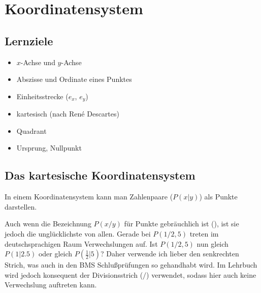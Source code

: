 
\section{Koordinatensystem}
\subsection*{Lernziele}

\begin{itemize}
\item $x$-Achse und $y$-Achse
\item Abszisse und Ordinate eines Punktes
\item Einheitsstrecke ($e_x$, $e_y$)
\item kartesisch (nach René Descartes)
\item Quadrant 
\item Ursprung, Nullpunkt
\end{itemize}


\subsection{Das kartesische Koordinatensystem}
In einem Koordinatensystem kann man Zahlenpaare ($P(x|y)$) als Punkte
darstellen.

\begin{bemerkung}{}{}
  Auch wenn die Bezeichnung $P(x/y)$ für Punkte gebräuchlich ist (\cite{frommenwiler17alg}), ist
  sie jedoch die unglücklichste von allen. Gerade bei $P(1/2,5)$
  treten im deutschsprachigen Raum Verwechslungen auf. Ist $P(1/2,5)$
  nun gleich $P(1 | 2.5)$ oder gleich $P(\frac{1}{2} | 5)$?
  Daher verwende ich lieber den senkrechten Strich, was auch in den
  BMS Schlußprüfungen so gehandhabt wird. Im Lehrbuch wird jedoch
  konsequent der Divisionsstrich ($/$) verwendet, sodass hier auch
  keine Verwechslung auftreten kann.
\end{bemerkung}
\newpage

